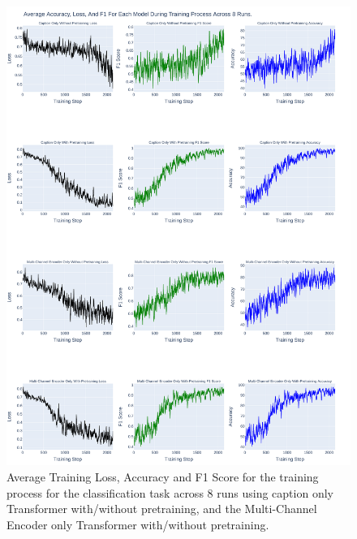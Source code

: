 \begin{figure}[p]
    \centering
    \includegraphics[width=\maxwidth{\textwidth}]{src/images/Loss-Distriubiton-Train-Set-1.pdf}
    \caption{Average Training Loss, Accuracy and F1 Score for the training process for the classification task across 8 runs using caption only Transformer with/without pretraining, and the Multi-Channel Encoder only Transformer with/without pretraining. }
    \label{figure\arabic{figurecounter}}
\end{figure}

